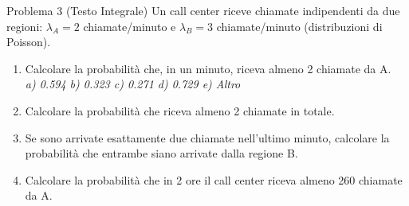 \documentclass[11pt,a4paper]{article}
\begin{document}
\begin{problemabox}{Problema 3 (Testo Integrale)}
Un call center riceve chiamate indipendenti da due regioni: $\lambda_A = 2$ chiamate/minuto e $\lambda_B = 3$ chiamate/minuto (distribuzioni di Poisson).
\begin{enumerate}[label=(\alph*)]
    \item Calcolare la probabilità che, in un minuto, riceva almeno 2 chiamate da A.\\
    \emph{a) 0.594 \quad b) 0.323 \quad c) 0.271 \quad d) 0.729 \quad e) Altro}
    \item Calcolare la probabilità che riceva almeno 2 chiamate in totale.
    \item Se sono arrivate esattamente due chiamate nell'ultimo minuto, calcolare la probabilità che entrambe siano arrivate dalla regione B.
    \item Calcolare la probabilità che in 2 ore il call center riceva almeno 260 chiamate da A.
\end{enumerate}
\end{problemabox}
\end{document}

